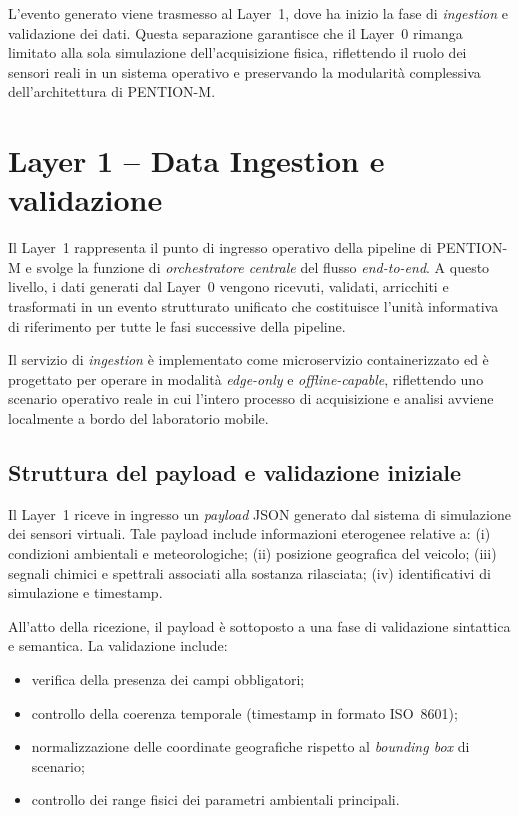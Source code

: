 L’evento generato viene trasmesso al Layer~1, dove ha inizio la fase di \textit{ingestion} e validazione dei dati.
Questa separazione garantisce che il Layer~0 rimanga limitato alla sola simulazione dell’acquisizione fisica, riflettendo il ruolo dei sensori reali in un sistema operativo e preservando la modularità complessiva dell’architettura di \textsc{PENTION-M}.

\section{Layer 1 -- Data Ingestion e validazione}
\label{sec:layer_ingestion}

Il Layer~1 rappresenta il punto di ingresso operativo della pipeline di \textsc{PENTION-M} e svolge la funzione di \emph{orchestratore centrale} del flusso \textit{end-to-end}.
A questo livello, i dati generati dal Layer~0 vengono ricevuti, validati, arricchiti e trasformati in un evento strutturato unificato che costituisce l’unità informativa di riferimento per tutte le fasi successive della pipeline.

Il servizio di \textit{ingestion} è implementato come microservizio containerizzato ed è progettato per operare in modalità \emph{edge-only} e \emph{offline-capable}, riflettendo uno scenario operativo reale in cui l’intero processo di acquisizione e analisi avviene localmente a bordo del laboratorio mobile.

\subsection{Struttura del payload e validazione iniziale}

Il Layer~1 riceve in ingresso un \textit{payload} JSON generato dal sistema di simulazione dei sensori virtuali.
Tale payload include informazioni eterogenee relative a:
(i) condizioni ambientali e meteorologiche;
(ii) posizione geografica del veicolo;
(iii) segnali chimici e spettrali associati alla sostanza rilasciata;
(iv) identificativi di simulazione e timestamp.

All’atto della ricezione, il payload è sottoposto a una fase di validazione sintattica e semantica.
La validazione include:
\begin{itemize}
	\item verifica della presenza dei campi obbligatori;
	\item controllo della coerenza temporale (timestamp in formato ISO~8601);
	\item normalizzazione delle coordinate geografiche rispetto al \textit{bounding box} di scenario;
	\item controllo dei range fisici dei parametri ambientali principali.
\end{itemize}

